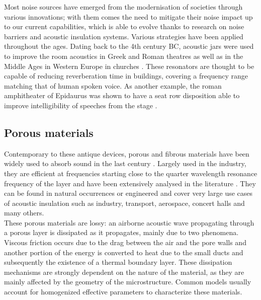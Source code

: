 Most noise sources have emerged from the modernisation of societies through various innovations; with them comes the need to mitigate their noise impact up to our current capabilities, which is able to evolve thanks to research on noise barriers and acoustic insulation systems. Various strategies have been applied throughout the ages. Dating back to the 4th century BC, acoustic jars were used to improve the room acoustics in Greek and Roman theatres as well as in the Middle Ages in Western Europe in churches \cite{valiere2013}. These resonators are thought to be capable of reducing reverberation time in buildings, covering a frequency range matching that of human spoken voice. As another example, the roman amphitheater of Epidaurus was shown to have a seat row disposition able to improve intelligibility of speeches from the stage \cite{declercq2007}. 

\subsection*{Porous materials}
Contemporary to these antique devices, porous and fibrous materials have been widely used to absorb sound in the last century \cite{allard2009, bruneau2006, auriault2002, liu2014porous, bourbie1986acoustique, coussy2011mechanics}. Largely used in the industry, they are efficient at frequencies starting close to the quarter wavelength resonance frequency of the layer and have been extensively analysed in the literature \cite{lafarge1993propag, lafarge1993, lafarge1997, duclos2006multiple, brouard1995general}. They can be found in natural occurrences or engineered and cover very large use cases of acoustic insulation such as industry, transport, aerospace, concert halls and many others.\\

These porous materials are lossy: an airborne acoustic wave propagating through a porous layer is dissipated as it propagates, mainly due to two phenomena. Viscous friction occurs due to the drag between the air and the pore walls and another portion of the energy is converted to heat due to the small ducts and subsequently the existence of a thermal boundary layer. These dissipation mechanisms are strongly dependent on the nature of the material, as they are mainly affected by the geometry of the microstructure. Common models usually account for homogenized effective parameters to characterize these materials. 

